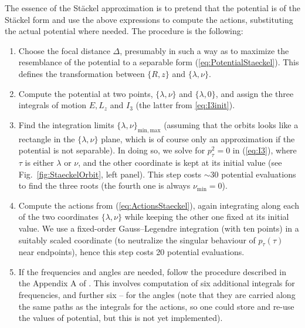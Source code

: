 \documentclass[12pt]{article}
\begin{document}
The essence of the St\"ackel approximation is to pretend that the potential is of the St\"ackel form and use the above expressions to compute the actions, substituting the actual potential where needed. The procedure is the following:
\begin{enumerate}
\item Choose the focal distance $\Delta$, presumably in such a way as to maximize the resemblance of the potential to a separable form (\ref{eq:PotentialStaeckel}). This defines the transformation between $\{R,z\}$ and $\{\lambda,\nu\}$.
\item Compute the potential at two points, $\{\lambda,\nu\}$ and $\{\lambda,0\}$, and assign the three integrals of motion $E, L_z$ and $I_3$ (the latter from \ref{eq:I3init}).
\item Find the integration limits $\{\lambda,\nu\}_\mathrm{min,max}$ (assuming that the orbits looks like a rectangle in the $\{\lambda,\nu\}$ plane, which is of course only an approximation if the potential is not separable). In doing so, we solve for $p_\tau^2=0$ in (\ref{eq:I3}), where $\tau$ is either $\lambda$ or $\nu$, and the other coordinate is kept at its initial value (see Fig.~\ref{fig:StaeckelOrbit}, left panel).
This step costs $\sim 30$ potential evaluations to find the three roots (the fourth one is always $\nu_\mathrm{min}=0$).
\item Compute the actions from (\ref{eq:ActionsStaeckel}), again integrating along each of the two coordinates $\{\lambda,\nu\}$ while keeping the other one fixed at its initial value.
We use a fixed-order Gauss--Legendre integration (with ten points) in a suitably scaled coordinate (to neutralize the singular behaviour of $p_\tau(\tau)$ near endpoints), hence this step costs 20 potential evaluations.
\item If the frequencies and angles are needed, follow the procedure described in the Appendix A of  \cite{Sanders2012}. This involves computation of six additional integrals for frequencies, and further six -- for the angles (note that they are carried along the same paths as the integrals for the actions, so one could store and re-use the values of potential, but this is not yet implemented).
\end{enumerate}
\end{document}
